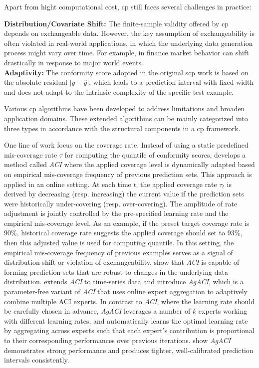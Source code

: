 \vspace{0.5em} 	
Apart from hight computational cost, \gls{cp} still faces several challenges in practice: 
\vspace{0.2em} 

\noindent \textbf{Distribution/Covariate Shift:} The finite-sample validity offered by \gls{cp} depends on exchangeable data. However, the key assumption of exchangeability is often violated in real-world applications, in which the underlying data generation process might vary over time. For example, in finance market behavior can shift drastically in response to major world events. \\
 \noindent \textbf{Adaptivity:} The conformity score adopted in the original \gls{scp} work is based on the  absolute residual $|y - \hat{y}|$, which leads to a prediction interval with fixed width and does not adapt to the intrinsic complexity of the specific test example.
  
Various \gls{cp} algorithms have been developed to address limitations and broaden application domains. These extended algorithms can be mainly categorized into three types in accordance with the structural components in a \gls{cp} framework. 

One line of work focus on the coverage rate. Instead of using a static predefined mis-coverage rate $\tau$ for computing the quantile of conformity scores, \cite{gibbs2021adaptive} develops a method called \textit{ACI} where the applied coverage level is dynamically adapted based on empirical mis-coverage frequency of previous prediction sets. This approach is applied in an online setting. At each time $t$, the applied coverage rate $\tau_t$ is derived by decreasing (resp. increasing) the current value if the prediction sets were historically under-covering (resp. over-covering). The amplitude of rate adjustment is jointly controlled by the pre-specified learning rate and the empirical mis-coverage level. As an example, if the preset target coverage rate is 90\%, historical coverage rate suggests the applied coverage should set to 93\%, then this adjusted value is used for computing quantile. In this setting, the empirical mis-coverage frequency of previous examples serves as a signal of distribution shift or violation of exchangeability. \cite{gibbs2021adaptive} show that \textit{ACI} is capable of forming prediction sets that are robust to changes in the underlying data distribution. \cite{zaffran2022adaptive} extends \textit{ACI} to time-series data and introduce \textit{AgACI}, which is a parameter-free variant of \textit{ACI} that uses online expert aggregation to adaptively combine multiple ACI experts. In contrast to \textit{ACI}, where the learning rate should be carefully chosen in advance, \textit{AgACI} leverages a number of $k$ experts working with different learning rates, and automatically learns the optimal learning rate by aggregating across experts such that each expert's contribution is proportional to their corresponding performances over previous iterations. \cite{zaffran2022adaptive} show \textit{AgACI} demonstrates strong performance and produces tighter, well-calibrated prediction intervals consistently.  
\vspace{0.5em} 

